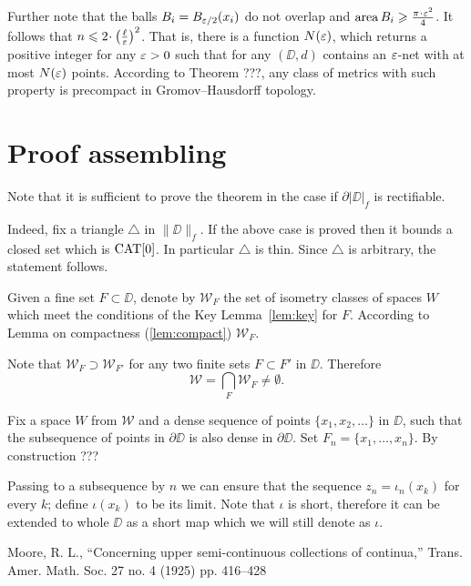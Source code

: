 \documentclass[a4paper,10pt]{amsart}
\begin{document}
Further note that the balls $B_i=B_{\varepsilon/2}(x_i)$
do not overlap and $\area B_i\ge \tfrac{\pi\cdot\eps^2}{4}$.
It follows that $n\le 2\cdot\left(\tfrac\ell\eps\right)^2$.
That is, there is a function $N(\varepsilon)$,
which returns a positive integer for any $\varepsilon>0$
such that for any 
$(\DD,d)$ contains an $\varepsilon$-net
with at most $N(\varepsilon)$ points.
According to Theorem ???, 
any class of metrics with such property is precompact in Gromov--Hausdorff topology.
\qeds


\section{Proof assembling}

Note that it is sufficient to prove the theorem 
in the case if $\partial |\DD|_f$ is rectifiable.

Indeed, fix a triangle $\triangle$ in $\|\DD\|_f$.
If the above case is proved 
then it bounds a closed set which is $\mathop{\rm CAT}\nolimits[0]$.
In particular $\triangle$ is thin.
Since $\triangle$ is arbitrary, the statement follows.

Given a fine set $F\subset \DD$,
denote by $\mathcal{W}_F$
the set of isometry classes of spaces $W$ which meet the conditions of the Key Lemma~\ref{lem:key}
for $F$.
According to Lemma on compactness (\ref{lem:compact}) $\mathcal{W}_F$.

Note that $\mathcal{W}_F\supset \mathcal{W}_{F'}$
for any two finite sets $F\subset F'$ in $\DD$.
Therefore 
\[\mathcal{W}
=
\bigcap_{F}\mathcal{W}_F\ne \emptyset.\]

Fix a space $W$ from $\mathcal{W}$
and a dense sequence of points $\{x_1,x_2,\dots\}$ in $\DD$,
such that the subsequence of points in $\partial \DD$
is also dense in $\partial \DD$.
Set $F_n=\{x_1,\dots,x_n\}$.
By construction ???

Passing to a subsequence by $n$ we can ensure that the sequence
$z_n=\iota_n(x_k)$ for every $k$;
define $\iota(x_k)$ to be its limit.
Note that $\iota$ is short, therefore it can be extended to whole $\DD$ as a short map which we will still denote as $\iota$.


\begin{thebibliography}{52}
Moore, R. L.,
``Concerning upper semi-continuous collections of continua,''
Trans. Amer. Math. Soc. 27 no. 4 (1925) pp. 416--428
\end{thebibliography}
\end{document}

